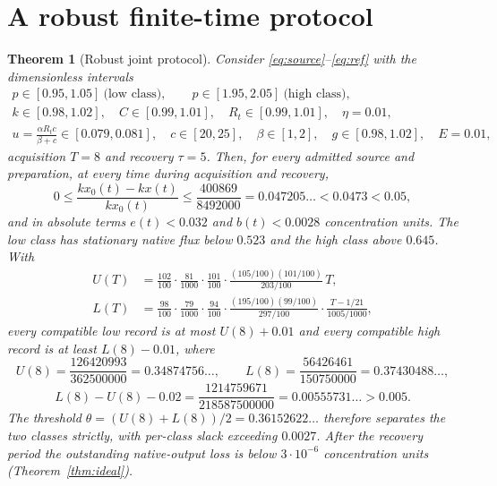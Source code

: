 \documentclass[11pt]{article}
\newtheorem{theorem}{Theorem}[section]
\theoremstyle{definition}
\theoremstyle{remark}
\begin{document}
\section{A robust finite-time protocol}
\label{sec:main}

\begin{theorem}[Robust joint protocol]\label{thm:main}
Consider \eqref{eq:source}--\eqref{eq:ref} with the dimensionless intervals
\begin{gather*}
p\in[0.95,1.05]\ \text{(low class)},\qquad p\in[1.95,2.05]\ \text{(high class)},\\
k\in[0.98,1.02],\quad C\in[0.99,1.01],\quad R_t\in[0.99,1.01],\quad \eta=0.01,\\
u=\frac{\alpha R_tc}{\beta+c}\in[0.079,0.081],\quad c\in[20,25],\quad
\beta\in[1,2],\quad g\in[0.98,1.02],\quad E=0.01,
\end{gather*}
acquisition $T=8$ and recovery $\tau=5$. Then, for every admitted source and
preparation, at every time during acquisition and recovery,
\begin{equation}
0\le\frac{kx_0(t)-kx(t)}{kx_0(t)}\le\frac{400869}{8492000}
=0.047205\ldots<0.0473<0.05,
\label{eq:main-pres}
\end{equation}
and in absolute terms $e(t)<0.032$ and $b(t)<0.0028$ concentration units. The
low class has stationary native flux below $0.523$ and the high class above
$0.645$. With
\[
\begin{aligned}
U(T)&=\frac{102}{100}\cdot\frac{81}{1000}\cdot\frac{101}{100}\cdot
\frac{(105/100)(101/100)}{203/100}\,T,\\[2pt]
L(T)&=\frac{98}{100}\cdot\frac{79}{1000}\cdot\frac{94}{100}\cdot
\frac{(195/100)(99/100)}{297/100}\cdot\frac{T-1/21}{1005/1000},
\end{aligned}
\]
every compatible low record is at most $U(8)+0.01$ and every compatible high
record is at least $L(8)-0.01$, where
\[
U(8)=\frac{126420993}{362500000}=0.34874756\ldots,\qquad
L(8)=\frac{56426461}{150750000}=0.37430488\ldots,
\]
\[
L(8)-U(8)-0.02=\frac{1214759671}{218587500000}=0.00555731\ldots>0.005 .
\]
The threshold $\theta=(U(8)+L(8))/2=0.36152622\ldots$ therefore separates the
two classes strictly, with per-class slack exceeding $0.0027$. After the
recovery period the outstanding native-output loss is below $3\cdot10^{-6}$
concentration units \textup{(}Theorem~\ref{thm:ideal}\textup{)}.
\end{theorem}
\end{document}
